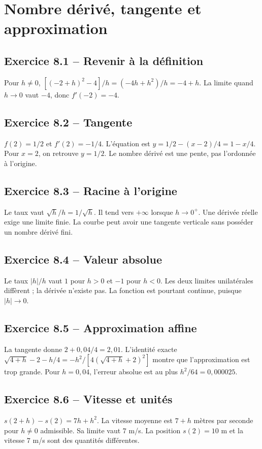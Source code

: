 \chapter{Nombre dérivé, tangente et approximation}
\section*{Exercice 8.1 -- Revenir à la définition}
Pour $h\ne0$, $[(-2+h)^2-4]/h=(-4h+h^2)/h=-4+h$. La limite quand $h\to0$ vaut $-4$, donc $f'(-2)=-4$.

\section*{Exercice 8.2 -- Tangente}
$f(2)=1/2$ et $f'(2)=-1/4$. L'équation est $y=1/2-(x-2)/4=1-x/4$. Pour $x=2$, on retrouve $y=1/2$. Le nombre dérivé est une pente, pas l'ordonnée à l'origine.

\section*{Exercice 8.3 -- Racine à l'origine}
Le taux vaut $\sqrt h/h=1/\sqrt h$. Il tend vers $+\infty$ lorsque $h\to0^+$. Une dérivée réelle exige une limite finie. La courbe peut avoir une tangente verticale sans posséder un nombre dérivé fini.

\section*{Exercice 8.4 -- Valeur absolue}
Le taux $|h|/h$ vaut $1$ pour $h>0$ et $-1$ pour $h<0$. Les deux limites unilatérales diffèrent ; la dérivée n'existe pas. La fonction est pourtant continue, puisque $|h|\to0$.

\section*{Exercice 8.5 -- Approximation affine}
La tangente donne $2+0{,}04/4=2{,}01$. L'identité exacte $\sqrt{4+h}-2-h/4=-h^2/[4(\sqrt{4+h}+2)^2]$ montre que l'approximation est trop grande. Pour $h=0{,}04$, l'erreur absolue est au plus $h^2/64=0{,}000025$.

\section*{Exercice 8.6 -- Vitesse et unités}
$s(2+h)-s(2)=7h+h^2$. La vitesse moyenne est $7+h$ mètres par seconde pour $h\ne0$ admissible. Sa limite vaut $7$ m/s. La position $s(2)=10$ m et la vitesse $7$ m/s sont des quantités différentes.
